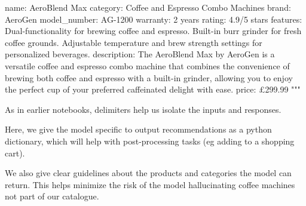 \documentclass[
  letterpaper,
  DIV=11,
  numbers=noendperiod]{scrreprt}
\newenvironment{Shaded}{\begin{snugshade}}{\end{snugshade}}
\newcommand{\StringTok}[1]{\textcolor[rgb]{0.13,0.47,0.30}{#1}}
\begin{document}
\begin{Shaded}
\begin{Highlighting}[]
\StringTok{name: AeroBlend Max}
\StringTok{category: Coffee and Espresso Combo Machines}
\StringTok{brand: AeroGen}
\StringTok{model\_number: AG{-}1200}
\StringTok{warranty: 2 years}
\StringTok{rating: 4.9/5 stars}
\StringTok{features:}
\StringTok{  Dual{-}functionality for brewing coffee and espresso.}
\StringTok{  Built{-}in burr grinder for fresh coffee grounds.}
\StringTok{  Adjustable temperature and brew strength settings for personalized beverages.}
\StringTok{description: The AeroBlend Max by AeroGen is a versatile coffee and espresso combo machine that combines the convenience of brewing both coffee and espresso with a built{-}in grinder,}
\StringTok{allowing you to enjoy the perfect cup of your preferred caffeinated delight with ease.}
\StringTok{price: £299.99}
\StringTok{"""}
\end{Highlighting}
\end{Shaded}

As in earlier notebooks, delimiters help us isolate the inputs and
responses.

Here, we give the model specific to output recommendations as a python
dictionary, which will help with post-processing tasks (eg adding to a
shopping cart).

We also give clear guidelines about the products and categories the
model can return. This helps minimize the risk of the model
hallucinating coffee machines not part of our catalogue.
\end{document}

